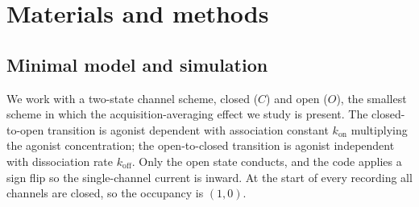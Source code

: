 \section*{Materials and methods}


\subsection*{Minimal model and simulation}

We work with a two-state channel scheme, closed ($C$) and open ($O$), the smallest
scheme in which the acquisition-averaging effect we study is present.
The closed-to-open transition is agonist dependent with association constant
$k_{\mathrm{on}}$ multiplying the agonist concentration; the open-to-closed
transition is agonist independent with dissociation rate $k_{\mathrm{off}}$. Only
the open state conducts, and the code applies a sign flip so the single-channel
current is inward. At the start of every recording all channels are closed, so the
occupancy is $(1,0)$.

